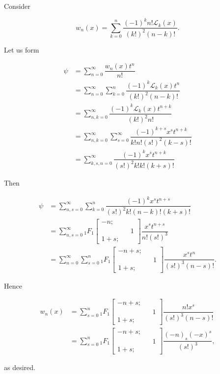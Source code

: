 \begin{solution}
Consider

$$w_n(x) = \displaystyle\sum_{k=0}^n \dfrac{(-1)^kn! \mathscr{L}_k(x)}{(k!)^2(n-k)!}.$$

Let us form

$$\begin{array}{ll}
\psi &= \displaystyle\sum_{n=0}^{\infty} \dfrac{w_n(x) t^n}{n!} \\
&= \displaystyle\sum_{n=0}^{\infty} \displaystyle\sum_{k=0}^n \dfrac{(-1)^k \mathscr{L}_k(x)t^n}{(k!)^2(n-k)!} \\
&= \displaystyle\sum_{n,k=0}^{\infty} \dfrac{(-1)^k \mathscr{L}_k(x) t^{n+k}}{(k!)^2n!} \\
&= \displaystyle\sum_{n,k=0}^{\infty} \displaystyle\sum_{s=0}^{\infty} \dfrac{(-1)^{k+s} x^s t^{n+k}}{k! n! (s!)^2(k-s)!} \\
&= \displaystyle\sum_{k,s,n=0}^{\infty} \dfrac{(-1)^k x^s t^{n+k}}{(s!)^2k!k!(k+s)!}
\end{array}$$

Then

$$\begin{array}{ll}
\psi &= \displaystyle\sum_{n,s=0}^{\infty} \displaystyle\sum_{k=0}^n \dfrac{(-1)^k x^s t^{n+s}}{(s!)^2k! (n-k)! (k+s)!} \\
&= \displaystyle\sum_{n,s=0}^{\infty} {}_1F_1 \left[ \begin{array}{rlr}
-n; & & \\
& & 1 \\
1+s; & & 
\end{array} \right] \dfrac{x^s t^{n+s}}{n! (s!)^3} \\
&= \displaystyle\sum_{n=0}^{\infty} \displaystyle\sum_{s=0}^n {}_1F_1 \left[ \begin{array}{rlr}
-n+s; & & \\
& & 1 \\
1+s; & & 
\end{array} \right] \dfrac{x^s t^n}{(s!)^3 (n-s)!}.
\end{array}$$

Hence

$$\begin{array}{ll}
w_n(x) &= \displaystyle\sum_{s=0}^n {}_1F_1\left[ \begin{array}{rlr}
-n+s; & & \\
& & 1 \\
1+s; & & 
\end{array} \right] \dfrac{n! x^s}{(s!)^3(n-s)!} \\
&= \displaystyle\sum_{s=0}^n {}_1F_1 \left[ \begin{array}{rlr}
-n+s; & & \\
& & 1 \\
1+s; & &
\end{array} \right] \dfrac{(-n)_s (-x)^s}{(s!)^3},
\end{array}$$

as desired.
\end{solution}
